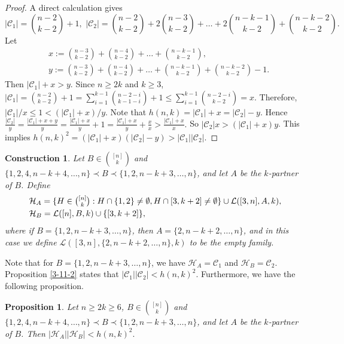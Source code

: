 \documentclass[a4paper,11pt]{article}
\newtheorem{construction}[theorem]{Construction}
\newtheorem{proposition}[theorem]{Proposition}
\newcommand{\m}{\mathcal}
\begin{document}
\begin{proof}
A direct calculation gives
\begin{equation*}
|\m C_1|={n-2\choose k-2}+1,\,\,|\m C_2|={n-2\choose k-2}+2{n-3\choose k-2}+\dots +2{n-k-1\choose k-2}+{n-k-2\choose k-2}. 
\end{equation*}
Let 
\begin{align*}
    &x:={n-3\choose k-2}+{n-4\choose k-2}+\dots +{n-k-1\choose k-2},\\
    &y:={n-3\choose k-2}+{n-4\choose k-2}+\dots +{n-k-1\choose k-2}+{n-k-2\choose k-2}-1.
\end{align*}
Then $|\m C_1|+x>y$. 
Since $n\ge 2k$ and $k\ge 3$, 
$
|\m C_1|={n-2\choose k-2}+1=\sum_{i=1}^{k-1}{n-2-i\choose k-1-i}+1\le \sum_{i=1}^{k-1}{n-2-i\choose k-2}=x.
$
Therefore, $|\m C_1|/x\le 1<(|\m C_1|+x)/y$. 
Note that $h(n,k)=|\m C_1|+x=|\m C_2|-y$.
Hence
$
\frac{|\m C_2|}{y}
=
\frac{|\m C_1|+x+y}{y}
=
\frac{|\m C_1|+x}{y}+1
=
\frac{|\m C_1|+x}{y}+\frac{x}{x}
>
\frac{|\m C_1|+x}{x}.
$
So $|\m C_2|x>(|\m C_1|+x)y$. This implies $h(n,k)^2=(|\m C_1|+x)(|\m C_2|-y)>|\m C_1||\m C_2|$. 
\end{proof}

\begin{construction}\label{H_AH_B}
Let $B\in {[n]\choose k}$ and $\{1,2,4,n-k+4, \dots, n\}\prec B \prec \{1,2, n-k+3, \dots,n\}$, and let $A$ be the $k$-partner of $B$. Define 
\begin{align*}
    &\m H_A=\{H\in \tbinom{[n]}{k}: H\cap \{1,2\}\ne \emptyset, H\cap [3,k+2]\ne \emptyset \}\cup \m L([3,n], A, k),\\
    &\m H_B=\m L([n], B, k) \cup \{[3,k+2]\},
\end{align*}
where if $B=\{1,2, n-k+3,\dots, n\}$, then $A=\{2,n-k+2,\dots,n\}$, and in this case we define
$\m L([3,n],\{2,n-k+2,\dots,n\},k)$ to be the empty family.
\end{construction}


 
Note that for $B=\{1,2, n-k+3,\dots, n\}$, we have $\m H_A=\m C_1$ and $\m H_B=\m C_2$. Proposition \ref{3-11-2} states that $|\m C_1||\m C_2|<h(n,k)^2$. Furthermore, we have the following proposition. 
\begin{proposition}\label{1-22-5}
Let $n\ge 2k\ge 6$, $B\in {[n]\choose k}$ and $\{1,2,4,n-k+4, \dots, n\}\prec B \prec \{1,2, n-k+3, \dots,n\}$, and let $A$ be the $k$-partner of $B$. Then 
$|\m H_A||\m H_B|<h(n,k)^2.$
\end{proposition}
\end{document}
